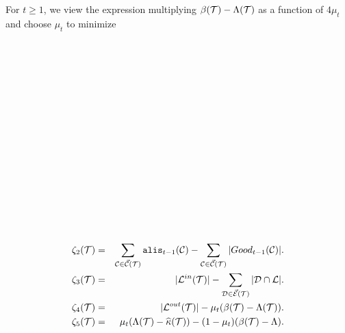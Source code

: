 \documentclass{acmsmall}
\newcommand{\cC}{{\cal C}}
\newcommand{\cD}{{\cal D}}
\newcommand{\cE}{{\cal E}}
\newcommand{\cL}{{\cal L}}
\newcommand{\cT}{{\cal T}}
\newcommand{\alis}{{\tt alis}}
\newcommand{\kappaest}{\widehat{\kappa}}
\newcommand{\errorterm}{\zeta}
\begin{document}
For $t \geq 1$,  we view the expression multiplying $\beta(\cT)-\Lambda(\cT)$ as a function of $4\mu_t$
and choose $\mu_t$ to minimize
\\\\\\\\\\\\\\\\\\\\\\\\\\\\\\\

\begin{eqnarray*}
\errorterm_2(\cT) & = & \sum_{\cC \in \vec{\cC}(\cT)} \alis_{t-1}(\cC) - \sum_{\cC \in \vec{\cC}(\cT)}|Good_{t-1}(\cC)|.\\
\errorterm_3(\cT) & = & |\cL^{in}(\cT)| - \sum_{\cD \in \vec{\cE}(\cT)} |\cD \cap \cL|.\\
\errorterm_4(\cT) &= &|\cL^{out}(\cT)| - \mu_t(\beta(\cT) - \Lambda(\cT)).\\
\errorterm_5(\cT)&=& \mu_t(\Lambda(\cT) - \kappaest(\cT)) - (1-\mu_t)(\beta(\cT)-\Lambda).
\end{eqnarray*}
\end{document}
